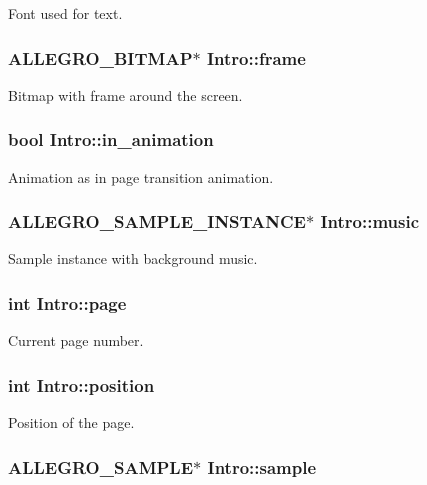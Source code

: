 \-Font used for text. \hypertarget{structIntro_a122ded263b7d3b22ee9a11555d84df52}{
\subsubsection[{frame}]{\setlength{\rightskip}{0pt plus 5cm}\-A\-L\-L\-E\-G\-R\-O\-\_\-\-B\-I\-T\-M\-A\-P$\ast$ {\bf \-Intro\-::frame}}}\label{structIntro_a122ded263b7d3b22ee9a11555d84df52}
\-Bitmap with frame around the screen. \hypertarget{structIntro_a2876fd8a7bfd940c3936eb6445984a22}{
\subsubsection[{in\-\_\-animation}]{\setlength{\rightskip}{0pt plus 5cm}bool {\bf \-Intro\-::in\-\_\-animation}}}\label{structIntro_a2876fd8a7bfd940c3936eb6445984a22}
\-Animation as in page transition animation. \hypertarget{structIntro_a461ce3f44fd4f7d2d3713e2f31c1d1ec}{
\subsubsection[{music}]{\setlength{\rightskip}{0pt plus 5cm}\-A\-L\-L\-E\-G\-R\-O\-\_\-\-S\-A\-M\-P\-L\-E\-\_\-\-I\-N\-S\-T\-A\-N\-C\-E$\ast$ {\bf \-Intro\-::music}}}\label{structIntro_a461ce3f44fd4f7d2d3713e2f31c1d1ec}
\-Sample instance with background music. \hypertarget{structIntro_aaea1b2d24c0c9a5437c59d727c79ebd1}{
\subsubsection[{page}]{\setlength{\rightskip}{0pt plus 5cm}int {\bf \-Intro\-::page}}}\label{structIntro_aaea1b2d24c0c9a5437c59d727c79ebd1}
\-Current page number. \hypertarget{structIntro_a5c266b2590d4304f92fd3bad033f4375}{
\subsubsection[{position}]{\setlength{\rightskip}{0pt plus 5cm}int {\bf \-Intro\-::position}}}\label{structIntro_a5c266b2590d4304f92fd3bad033f4375}
\-Position of the page. \hypertarget{structIntro_a0189475d44f8e19e6fe543371a9daedb}{
\subsubsection[{sample}]{\setlength{\rightskip}{0pt plus 5cm}\-A\-L\-L\-E\-G\-R\-O\-\_\-\-S\-A\-M\-P\-L\-E$\ast$ {\bf \-Intro\-::sample}}}\label{structIntro_a0189475d44f8e19e6fe543371a9daedb}
